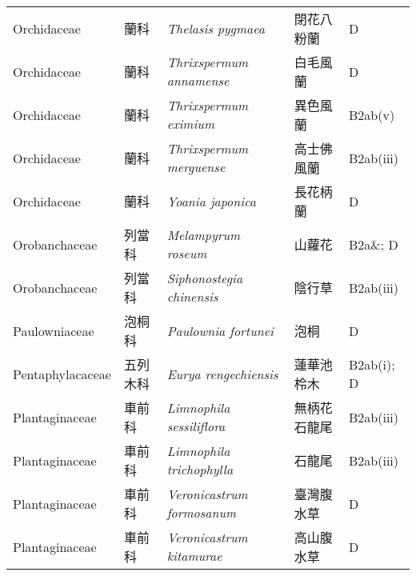{\begin{longtable}{p{2.5cm}p{2.5cm}p{4.5cm}p{2.5cm}p{3cm}}
    Orchidaceae & 蘭科 & \textit{Thelasis pygmaea}  & 閉花八粉蘭 & D \index{Thelasis@\textit{Thelasis}!pygmaea@\textit{pygmaea}}  \index{閉花八粉蘭} \\
    Orchidaceae & 蘭科 & \textit{Thrixspermum annamense}  & 白毛風蘭 & D \index{Thrixspermum@\textit{Thrixspermum}!annamense@\textit{annamense}}  \index{白毛風蘭} \\
    Orchidaceae & 蘭科 & \textit{Thrixspermum eximium}  & 異色風蘭 & B2ab(v) \index{Thrixspermum@\textit{Thrixspermum}!eximium@\textit{eximium}}  \index{異色風蘭} \\
    Orchidaceae & 蘭科 & \textit{Thrixspermum merguense}  & 高士佛風蘭 & B2ab(iii) \index{Thrixspermum@\textit{Thrixspermum}!merguense@\textit{merguense}}  \index{高士佛風蘭} \\
    Orchidaceae & 蘭科 & \textit{Yoania japonica}  & 長花柄蘭 & D \index{Yoania@\textit{Yoania}!japonica@\textit{japonica}}  \index{長花柄蘭} \\
    Orobanchaceae & 列當科 & \textit{Melampyrum roseum}  & 山蘿花 & B2a\&; D \index{Melampyrum@\textit{Melampyrum}!roseum@\textit{roseum}}  \index{山蘿花} \\
    Orobanchaceae & 列當科 & \textit{Siphonostegia chinensis}  & 陰行草 & B2ab(iii) \index{Siphonostegia@\textit{Siphonostegia}!chinensis@\textit{chinensis}}  \index{陰行草} \\
    Paulowniaceae & 泡桐科 & \textit{Paulownia fortunei}  & 泡桐 & D \index{Paulownia@\textit{Paulownia}!fortunei@\textit{fortunei}}  \index{泡桐} \\
    Pentaphylacaceae & 五列木科 & \textit{Eurya rengechiensis}  & 蓮華池柃木 & B2ab(i); D \index{Eurya@\textit{Eurya}!rengechiensis@\textit{rengechiensis}}  \index{蓮華池柃木} \\
    Plantaginaceae & 車前科 & \textit{Limnophila sessiliflora}  & 無柄花石龍尾 & B2ab(iii) \index{Limnophila@\textit{Limnophila}!sessiliflora@\textit{sessiliflora}}  \index{無柄花石龍尾} \\
    Plantaginaceae & 車前科 & \textit{Limnophila trichophylla}  & 石龍尾 & B2ab(iii) \index{Limnophila@\textit{Limnophila}!trichophylla@\textit{trichophylla}}  \index{石龍尾} \\
    Plantaginaceae & 車前科 & \textit{Veronicastrum formosanum}  & 臺灣腹水草 & D \index{Veronicastrum@\textit{Veronicastrum}!formosanum@\textit{formosanum}}  \index{臺灣腹水草} \\
    Plantaginaceae & 車前科 & \textit{Veronicastrum kitamurae}  & 高山腹水草 & D \index{Veronicastrum@\textit{Veronicastrum}!kitamurae@\textit{kitamurae}}  \index{高山腹水草} \\

\end{longtable}}
